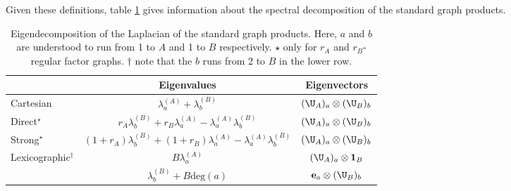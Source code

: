 Given these definitions, table \ref{tab:product_graph_spectra} gives information about the spectral decomposition of the standard graph products.


\begin{table}[h]
    \def\arraystretch{1.8}
    \centering
    \small
    \vspace{0.5cm}
    \begin{tabular}{|l|cc|}
        \hline

         & Eigenvalues
         & Eigenvectors                                                                          \\

        \hline

        Cartesian
         & $\lambda_a^{(A)} + \lambda_b^{(B)}$
         & $(\U_A)_a \otimes (\U_B)_b$                                                           \\

        Direct$^{\star}$
         & $r_A \lambda_b^{(B)} + r_B \lambda_a^{(A)} - \lambda_a^{(A)} \lambda_b^{(B)}$
         & $(\U_A)_a \otimes (\U_B)_b$                                                           \\

        Strong$^{\star}$
         & $(1+r_A) \lambda_b^{(B)} + (1+r_B) \lambda_a ^{(A)}- \lambda_a^{(A)} \lambda_b^{(B)}$
         & $(\U_A)_a \otimes (\U_B)_b$                                                           \\

        \multirow{2}{7em}{Lexicographic$^\dagger$}
         & $B \lambda_a^{(A)}$
         & $(\U_A)_a \otimes \mathbf{1}_B$                                                       \\

         & $\lambda_b^{(B)} + B \text{deg}(a)$
         & $\mathbf{e}_a \otimes (\U_B)_b$                                                       \\

        \hline
    \end{tabular}
    \vspace{0.2cm}
    \caption[Spectral decomposition of product graphs]{Eigendecomposition of the Laplacian of the standard graph products. Here, $a$ and $b$ are understood to run from 1 to $A$ and 1 to $B$ respectively. $\star$ only for $r_A$ and $r_B$-regular factor graphs. $\dagger$ note that the $b$ runs from 2 to $B$ in the lower row. }
    \vspace{0.3cm}
    \label{tab:product_graph_spectra}
\end{table}

